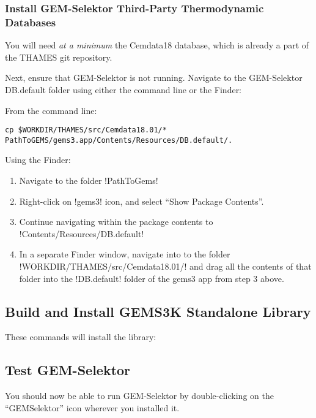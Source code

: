 \documentclass{article}
\begin{document}
\subsubsection{\label{sec:thirdpartymac}Install GEM-Selektor Third-Party Thermodynamic Databases}
You will need \textit{at a minimum} the Cemdata18 database, which is already a
part of the THAMES git repository.

Next, ensure that GEM-Selektor is not running. Navigate to the GEM-Selektor DB.default
folder using either the command line or the Finder:

From the command line:

\begin{Verbatim}[breaklines=true]
cp $WORKDIR/THAMES/src/Cemdata18.01/* PathToGEMS/gems3.app/Contents/Resources/DB.default/.
\end{Verbatim}

Using the Finder:
\begin{enumerate}
  \item Navigate to the folder !PathToGems!
  \item Right-click on !gems3! icon, and select ``Show Package
    Contents''.
  \item Continue navigating within the package contents to
    !Contents/Resources/DB.default!
  \item In a separate Finder window, navigate into to the folder
    !WORKDIR/THAMES/src/Cemdata18.01/! and drag all the
    contents of that folder into the !DB.default! folder
    of the gems3 app from step 3 above.
\end{enumerate}

\subsection{Build and Install GEMS3K Standalone Library}
These commands will install the library:

\subsection{Test GEM-Selektor}
You should now be able to run GEM-Selektor by double-clicking on the ``GEMSelektor''
icon wherever you installed it.
\end{document}

